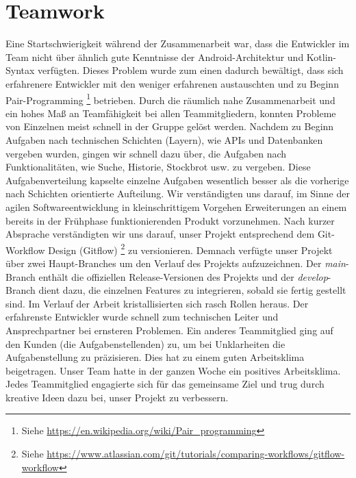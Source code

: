 \documentclass[a4paper]{article}
\begin{document}
\section{Teamwork}
\label{sec:teamwork}
Eine Startschwierigkeit während der Zusammenarbeit war, dass die Entwickler im Team nicht über ähnlich gute Kenntnisse der Android-Architektur und Kotlin-Syntax verfügten. Dieses Problem wurde zum einen dadurch bewältigt, dass sich erfahrenere Entwickler mit den weniger erfahrenen austauschten und zu Beginn Pair-Programming \footnote{Siehe \url{https://en.wikipedia.org/wiki/Pair_programming}} betrieben. Durch die räumlich nahe Zusammenarbeit und ein hohes Maß an Teamfähigkeit bei allen Teammitgliedern, konnten Probleme von Einzelnen meist schnell in der Gruppe gelöst werden. Nachdem zu Beginn Aufgaben nach technischen Schichten (Layern), wie APIs und Datenbanken vergeben wurden, gingen wir schnell dazu über, die Aufgaben nach Funktionalitäten, wie Suche, Historie, Stockbrot usw. zu vergeben. Diese Aufgabenverteilung kapselte einzelne Aufgaben wesentlich besser als die vorherige nach Schichten orientierte Aufteilung. Wir verständigten uns darauf, im Sinne der agilen Softwareentwicklung in kleinschrittigem Vorgehen Erweiterungen an einem bereits in der Frühphase funktionierenden Produkt vorzunehmen. Nach kurzer Absprache verständigten wir uns darauf, unser Projekt entsprechend dem Git-Workflow Design (Gitflow) \footnote{Siehe \url{https://www.atlassian.com/git/tutorials/comparing-workflows/gitflow-workflow}} zu versionieren. Demnach verfügte unser Projekt über zwei Haupt-Branches um den Verlauf des Projekts aufzuzeichnen. Der \textit{main}-Branch enthält die offiziellen Release-Versionen des Projekts und der \textit{develop}-Branch dient dazu, die einzelnen Features zu integrieren, sobald sie fertig gestellt sind. \newline
Im Verlauf der Arbeit kristallisierten sich rasch Rollen heraus. Der erfahrenste Entwickler wurde schnell zum technischen Leiter und Ansprechpartner bei ernsteren Problemen. Ein anderes Teammitglied ging auf den Kunden (die Aufgabenstellenden) zu, um bei Unklarheiten die Aufgabenstellung zu präzisieren. Dies hat zu einem guten Arbeitsklima beigetragen. \newline
Unser Team hatte in der ganzen Woche ein positives Arbeitsklima. Jedes Teammitglied engagierte sich für das gemeinsame Ziel und trug durch kreative Ideen dazu bei, unser Projekt zu verbessern.
\end{document}
